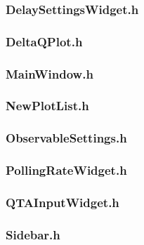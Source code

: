 \subsubsection*{DelaySettingsWidget.h}


\subsubsection*{DeltaQPlot.h}


\subsubsection*{MainWindow.h}


\subsubsection*{NewPlotList.h}


\subsubsection*{ObservableSettings.h}


\subsubsection*{PollingRateWidget.h}


\subsubsection*{QTAInputWidget.h}


\subsubsection*{Sidebar.h}


